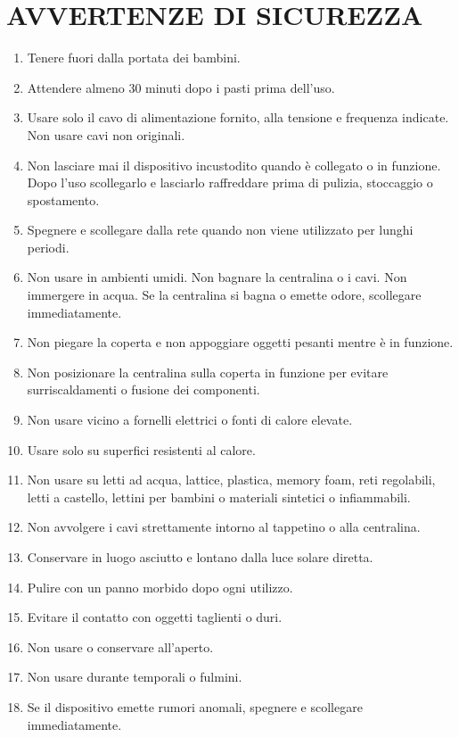 \documentclass[a4paper]{article}
\begin{document}
\section{AVVERTENZE DI SICUREZZA}
\begin{enumerate}
  \item Tenere fuori dalla portata dei bambini.
  \item Attendere almeno 30 minuti dopo i pasti prima dell'uso.
  \item Usare solo il cavo di alimentazione fornito, alla tensione e frequenza indicate. Non usare cavi non originali.
  \item Non lasciare mai il dispositivo incustodito quando è collegato o in funzione. Dopo l'uso scollegarlo e lasciarlo raffreddare prima di pulizia, stoccaggio o spostamento.
  \item Spegnere e scollegare dalla rete quando non viene utilizzato per lunghi periodi.
  \item Non usare in ambienti umidi. Non bagnare la centralina o i cavi. Non immergere in acqua. Se la centralina si bagna o emette odore, scollegare immediatamente.
  \item Non piegare la coperta e non appoggiare oggetti pesanti mentre è in funzione.
  \item Non posizionare la centralina sulla coperta in funzione per evitare surriscaldamenti o fusione dei componenti.
  \item Non usare vicino a fornelli elettrici o fonti di calore elevate.
  \item Usare solo su superfici resistenti al calore.
  \item Non usare su letti ad acqua, lattice, plastica, memory foam, reti regolabili, letti a castello, lettini per bambini o materiali sintetici o infiammabili.
  \item Non avvolgere i cavi strettamente intorno al tappetino o alla centralina.
  \item Conservare in luogo asciutto e lontano dalla luce solare diretta.
  \item Pulire con un panno morbido dopo ogni utilizzo.
  \item Evitare il contatto con oggetti taglienti o duri.
  \item Non usare o conservare all'aperto.
  \item Non usare durante temporali o fulmini.
  \item Se il dispositivo emette rumori anomali, spegnere e scollegare immediatamente.
\end{enumerate}
\end{document}
